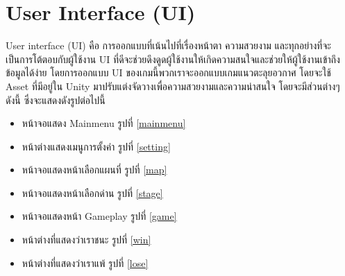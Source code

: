 \section{User Interface (UI)}
User interface (UI) คือ การออกแบบที่เน้นไปที่เรื่องหน้าตา ความสวยงาม และทุกอย่างที่จะเป็นการโต้ตอบกับผู้ใช้งาน UI ที่ดีจะช่วยดึงดูดผู้ใช้งานให้เกิดความสนใจและช่วยให้ผู้ใช้งานเข้าถึงข้อมูลได้ง่าย
โดยการออกแบบ UI ของเกมนี้พวกเราจะออกแบบเกมแนวตะลุยอวกาศ โดยจะใช้ Asset ที่มีอยู่ใน Unity มาปรับแต่งจัดวางเพื่อความสวยงามและความน่าสนใจ โดยจะมีส่วนต่างๆ ดังนี้ ซึ่งจะแสดงดังรูปต่อไปนี้
\begin{itemize}
\item หน้าจอแสดง Mainmenu รูปที่ \ref{mainmenu}
\item หน้าต่างแสดงเมนูการตั้งค่า รูปที่ \ref{setting}
\item หน้าจอแสดงหน้าเลือกแผนที่ รูปที่ \ref{map}
\item หน้าจอแสดงหน้าเลือกด่าน รูปที่ \ref{stage}
\item หน้าจอแสดงหน้า Gameplay รูปที่ \ref{game}
\item หน้าต่างที่แสดงว่าเราชนะ รูปที่ \ref{win}
\item หน้าต่างที่แสดงว่าเราแพ้ รูปที่ \ref{lose}
\end{itemize}

